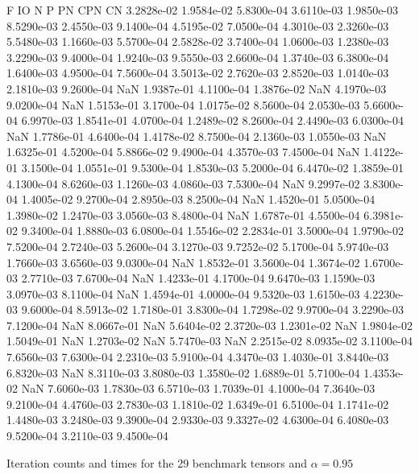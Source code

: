 \documentclass[10pt]{paper}
\begin{document}
\begin{table}
{	F IO N P PN CPN CN
   3.2828e-02   1.9584e-02   5.8300e-04   3.6110e-03   1.9850e-03   8.5290e-03   2.4550e-03
   9.1400e-04   4.5195e-02   7.0500e-04   4.3010e-03   2.3260e-03   5.5480e-03   1.1660e-03
   5.5700e-04   2.5828e-02   3.7400e-04   1.0600e-03   1.2380e-03   3.2290e-03   9.4000e-04
   1.9240e-03   9.5550e-03   2.6600e-04   1.3740e-03   6.3800e-04   1.6400e-03   4.9500e-04
   7.5600e-04   3.5013e-02   2.7620e-03   2.8520e-03   1.0140e-03   2.1810e-03   9.2600e-04
          NaN   1.9387e-01   4.1100e-04   1.3876e-02          NaN   4.1970e-03   9.0200e-04
          NaN   1.5153e-01   3.1700e-04   1.0175e-02   8.5600e-04   2.0530e-03   5.6600e-04
   6.9970e-03   1.8541e-01   4.0700e-04   1.2489e-02   8.2600e-04   2.4490e-03   6.0300e-04
          NaN   1.7786e-01   4.6400e-04   1.4178e-02   8.7500e-04   2.1360e-03   1.0550e-03
          NaN   1.6325e-01   4.5200e-04   5.8866e-02   9.4900e-04   4.3570e-03   7.4500e-04
          NaN   1.4122e-01   3.1500e-04   1.0551e-01   9.5300e-04   1.8530e-03   5.2000e-04
   6.4470e-02   1.3859e-01   4.1300e-04   8.6260e-03   1.1260e-03   4.0860e-03   7.5300e-04
          NaN   9.2997e-02   3.8300e-04   1.4005e-02   9.2700e-04   2.8950e-03   8.2500e-04
          NaN   1.4520e-01   5.0500e-04   1.3980e-02   1.2470e-03   3.0560e-03   8.4800e-04
          NaN   1.6787e-01   4.5500e-04   6.3981e-02   9.3400e-04   1.8880e-03   6.0800e-04
   1.5546e-02   2.2834e-01   3.5000e-04   1.9790e-02   7.5200e-04   2.7240e-03   5.2600e-04
   3.1270e-03   9.7252e-02   5.1700e-04   5.9740e-03   1.7660e-03   3.6560e-03   9.0300e-04
          NaN   1.8532e-01   3.5600e-04   1.3674e-02   1.6700e-03   2.7710e-03   7.6700e-04
          NaN   1.4233e-01   4.1700e-04   9.6470e-03   1.1590e-03   3.0970e-03   8.1100e-04
          NaN   1.4594e-01   4.0000e-04   9.5320e-03   1.6150e-03   4.2230e-03   9.6000e-04
   8.5913e-02   1.7180e-01   3.8300e-04   1.7298e-02   9.9700e-04   3.2290e-03   7.1200e-04
          NaN   8.0667e-01          NaN   5.6404e-02   2.3720e-03   1.2301e-02          NaN
   1.9804e-02   1.5049e-01          NaN   1.2703e-02          NaN   5.7470e-03          NaN
   2.2515e-02   8.0935e-02   3.1100e-04   7.6560e-03   7.6300e-04   2.2310e-03   5.9100e-04
   4.3470e-03   1.4030e-01   3.8440e-03   6.8320e-03          NaN   8.3110e-03   3.8080e-03
   1.3580e-02   1.6889e-01   5.7100e-04   1.4353e-02          NaN   7.6060e-03   1.7830e-03
   6.5710e-03   1.7039e-01   4.1000e-04   7.3640e-03   9.2100e-04   4.4760e-03   2.7830e-03
   1.1810e-02   1.6349e-01   6.5100e-04   1.1741e-02   1.4480e-03   3.2480e-03   9.3900e-04
   2.9330e-03   9.3327e-02   4.6300e-04   6.4080e-03   9.5200e-04   3.2110e-03   9.4500e-04
	}	
	\caption{Iteration counts and times for the 29 benchmark tensors and $\alpha = 0.95$}
\end{table}
\end{document}
